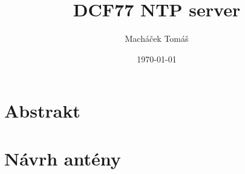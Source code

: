 \documentclass[12pt]{report}
\title{DCF77 NTP server}
\author{Macháček Tomáš}
\date{\today}
\begin{document}




\chapter{Abstrakt}


\tableofcontents

\chapter{Návrh antény}

\end{document}
